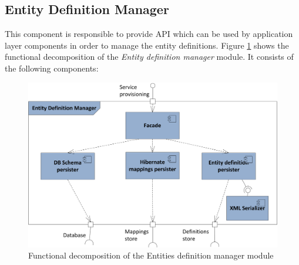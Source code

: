 \subsection{Entity Definition Manager}
This component is responsible to provide API which can be used by application layer components in order to manage the entity definitions. Figure \ref{fig:storageFuncAccess} shows the functional decomposition of the \textit{Entity definition manager} module. It consists of the following components:

\begin{figure}[h!]
  \centering
  	\includegraphics[scale=0.7]{storage/functional/func_access.png}
  \caption{Functional decomposition of the Entities definition manager module}
  \label{fig:storageFuncAccess}
\end{figure}

